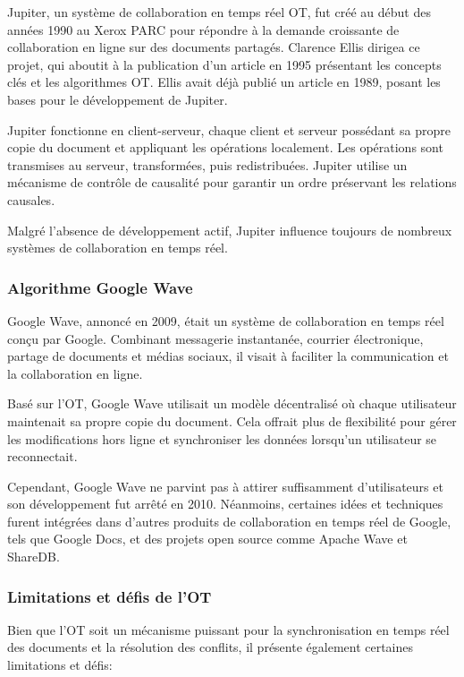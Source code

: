 Jupiter, un système de collaboration en temps réel OT, fut créé au début des années 1990 au Xerox PARC pour répondre à la demande croissante de collaboration en ligne sur des documents partagés. Clarence Ellis dirigea ce projet, qui aboutit à la publication d'un article en 1995 présentant les concepts clés et les algorithmes OT. Ellis avait déjà publié un article en 1989, posant les bases pour le développement de Jupiter.

Jupiter fonctionne en client-serveur, chaque client et serveur possédant sa propre copie du document et appliquant les opérations localement. Les opérations sont transmises au serveur, transformées, puis redistribuées. Jupiter utilise un mécanisme de contrôle de causalité pour garantir un ordre préservant les relations causales.

Malgré l'absence de développement actif, Jupiter influence toujours de nombreux systèmes de collaboration en temps réel.

\subsubsection{Algorithme Google Wave}

Google Wave, annoncé en 2009, était un système de collaboration en temps réel conçu par Google. Combinant messagerie instantanée, courrier électronique, partage de documents et médias sociaux, il visait à faciliter la communication et la collaboration en ligne.

Basé sur l'OT, Google Wave utilisait un modèle décentralisé où chaque utilisateur maintenait sa propre copie du document. Cela offrait plus de flexibilité pour gérer les modifications hors ligne et synchroniser les données lorsqu'un utilisateur se reconnectait.

Cependant, Google Wave ne parvint pas à attirer suffisamment d'utilisateurs et son développement fut arrêté en 2010. Néanmoins, certaines idées et techniques furent intégrées dans d'autres produits de collaboration en temps réel de Google, tels que Google Docs, et des projets open source comme Apache Wave et ShareDB.

\subsubsection{Limitations et défis de l'OT}

Bien que l'OT soit un mécanisme puissant pour la synchronisation en temps réel des documents et la résolution des conflits, il présente également certaines limitations et défis:

